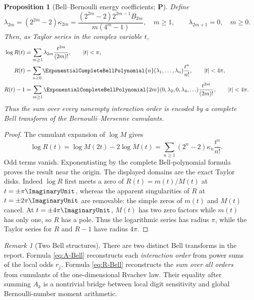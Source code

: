 \documentclass[11pt,oneside]{article}
\newtheorem{proposition}[theorem]{Proposition}
\theoremstyle{definition}
\theoremstyle{remark}
\newtheorem{remark}[theorem]{Remark}
\newcommand{\statusP}{\textcolor{deepgreen}{\textbf{P}}}
\begin{document}
\begin{proposition}[Bell--Bernoulli energy coefficients; \statusP]
\label{prop:Bell-Bernoulli-energy}
Define
\begin{equation}
 \lambda_{2m}=(2^{2m}-2)\kappa_{2m}
 =\frac{(2^{2m}-2)2^{2m-1}B_{2m}}{m(4^m-1)},
 \quad m\ge1,
 \qquad
 \lambda_{2m+1}=0,\quad m\ge0.
 \label{eq:lambda-energy}
\end{equation}
Then, as Taylor series in the complex variable $t$,
\begin{align}
 \log R(t)
 &=\sum_{m\ge1}\lambda_{2m}\frac{t^{2m}}{(2m)!},
 \qquad |t|<\pi,
 \label{eq:logR-cumulants}\\
 R(t)
 &=\sum_{n\ge0}\ExponentialCompleteBellPolynomial{n}(\lambda_1,\ldots,\lambda_n)
                   \frac{t^n}{n!},
 \qquad |t|<4\pi,
 \label{eq:R-Bell}\\
 R(t)-1
 &=\sum_{m\ge1}\ExponentialCompleteBellPolynomial{2m}(0,\lambda_2,0,\lambda_4,\ldots)
                   \frac{t^{2m}}{(2m)!},
 \qquad |t|<4\pi.
 \label{eq:Rminus1-Bell}
\end{align}
Thus the sum over every nonempty interaction order is encoded by a complete
Bell transform of the Bernoulli--Mersenne cumulants.
\end{proposition}

\begin{proof}
The cumulant expansion of $\log M$ gives
\[
 \log R(t)=\log M(2t)-2\log M(t)
 =\sum_{n\ge1}(2^n-2)\kappa_n\frac{t^n}{n!}.
\]
Odd terms vanish.  Exponentiating by the complete Bell-polynomial formula
proves the result near the origin.  The displayed domains are the exact Taylor
disks.  Indeed $\log R$ first meets a zero of
$R(t)=m(t)/M(t)$ at $t=\pm\pi\ImaginaryUnit$, whereas the apparent singularities of $R$
at $t=\pm2\pi\ImaginaryUnit$ are removable: the simple zeros of $m(t)$ and $M(t)$
cancel.  At $t=\pm4\pi\ImaginaryUnit$, $M(t)$ has two zero factors while $m(t)$ has only
one, so $R$ has a pole.  Thus the logarithmic series has radius $\pi$, while
the Taylor series for $R$ and $R-1$ have radius $4\pi$.
\end{proof}

\begin{remark}[Two Bell structures]
There are two distinct Bell transforms in the report.  Formula
\eqref{eq:A-Bell} reconstructs each \emph{interaction order} from power sums
of the local odds $r_j$.  Formula \eqref{eq:R-Bell} reconstructs the
\emph{sum over all orders} from cumulants of the one-dimensional Rvachev law.
Their equality after summing $A_k$ is a nontrivial bridge between local digit
sensitivity and global Bernoulli-number moment arithmetic.
\end{remark}
\end{document}
